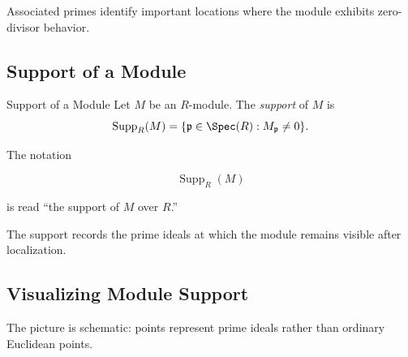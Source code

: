 Associated primes identify important locations where the module exhibits
zero-divisor behavior.

\subsection{Support of a Module}
\label{subsec:support-module}

\begin{definitionbox}{Support of a Module}
Let \(M\) be an \(R\)-module. The \emph{support} of \(M\) is
\[ \operatorname{Supp}_R(M)
=\{\mathfrak p\in\Spec(R):M_{\mathfrak p}\neq0\}. \]
\end{definitionbox}

The notation

\[ \operatorname{Supp}_R(M) \]

is read ``the support of \(M\) over \(R\).''

The support records the prime ideals at which the module remains visible
after localization.

\subsection{Visualizing Module Support}
\label{subsec:module-support-visual}

\begin{center}
\end{center}

The picture is schematic: points represent prime ideals rather than ordinary
Euclidean points.

